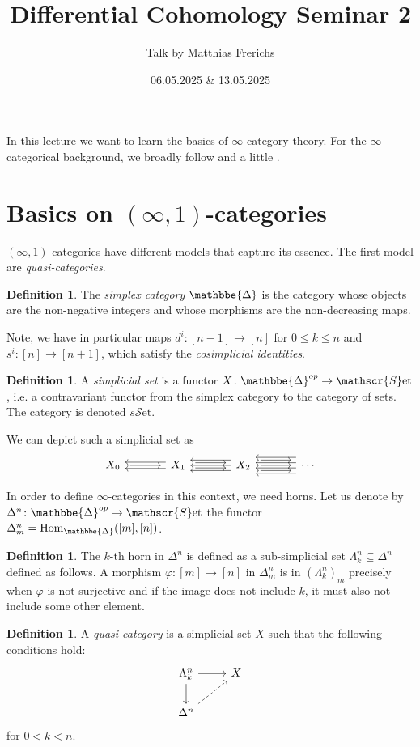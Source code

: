 \documentclass[10pt]{amsart}
\title{Differential Cohomology Seminar 2}
\date{06.05.2025 $\&$ 13.05.2025}
\author{Talk by Matthias Frerichs}
\newcommand{\set}{\mathscr{S}\mathrm{et}}
\newcommand{\sset}{s\mathscr{S}\mathrm{et}}
\newcommand{\Hom}{\mathrm{Hom}}
\def\DDelta{{\mathbbe{\Delta}}}
\newcommand{\DD}{\DDelta}
\newcommand{\simpset}[7]{
 \begin{tikzcd}[row sep=0.5in, column sep=0.5in]
   #1 \arrow[r, shorten >=1ex,shorten <=1ex]
   \pgfmatrixnextcell #2 
   \arrow[l, shift left=1.2, "#5"] \arrow[l, shift right=1.2, "#4"'] 
   \arrow[r, shift right, shorten >=1ex,shorten <=1ex ] \arrow[r, shift left, shorten >=1ex,shorten <=1ex] 
   \pgfmatrixnextcell #3 
   \arrow[l] \arrow[l, shift left=2, "#7"] \arrow[l, shift right=2, "#6 "'] 
   \arrow[r, shorten >=1ex,shorten <=1ex] \arrow[r, shift left=2, shorten >=1ex,shorten <=1ex] \arrow[r, shift right=2, 
   shorten >=1ex,shorten <=1ex]
   \pgfmatrixnextcell \cdots 
   \arrow[l, shift right=1] \arrow[l, shift left=1] \arrow[l, shift right=3] \arrow[l, shift left=3] 
 \end{tikzcd}
}
\theoremstyle{definition}
\newtheorem{definition}[equation]{Definition}
\theoremstyle{remark}
\begin{document}
\maketitle

In this lecture we want to learn the basics of $\infty$-category theory. For the $\infty$-categorical background, we broadly follow \cite{groth2010inftycats} and a little \cite{lurie2009htt}.

\section{Basics on \texorpdfstring{$(\infty,1)$}{(oo,1)}-categories}

$(\infty,1)$-categories have different models that capture its essence. The first model are \emph{quasi-categories}.

\begin{definition}
  The \emph{simplex category} $\DD$ is the category whose objects are the non-negative integers and whose morphisms are the non-decreasing maps. 
\end{definition}

Note, we have in particular maps $d^i \colon [n-1] \to [n]$ for $0 \leq k \leq n$ and $s^i\colon [n] \to [n+1]$, which satisfy the \emph{cosimplicial identities}.


\begin{definition}
  A \emph{simplicial set} is a functor $X \colon \DD^{op} \to \set$, i.e. a contravariant functor from the simplex category to the category of sets. The category is denoted $\sset$.
\end{definition}

We can depict such a simplicial set as 
\[
  \simpset{X_0}{X_1}{X_2}{}{}{}{}
\]

In order to define $\infty$-categories in this context, we need horns. Let us denote by $\Delta^n\colon\DD^{op} \to \set$ the functor $\Delta^n_m = \Hom_\DD([m],[n])$.

\begin{definition}
  The $k$-th horn in $\Delta^n$ is defined as a sub-simplicial set $\Lambda^n_k \subseteq \Delta^n$ defined as follows. A morphism $\varphi\colon[m] \to [n]$ in $\Delta^n_m$ is in $(\Lambda^n_k)_m$ precisely when $\varphi$ is not surjective and if the image does not include $k$, it must also not include some other element.
\end{definition}

\begin{definition}
  A \emph{quasi-category} is a simplicial set $X$ such that the following conditions hold:
  \[
    \begin{tikzcd}
    \Lambda^n_k \arrow[r] \arrow[d] & X \\
    \Delta^n \arrow[ur, dashed] 
    \end{tikzcd}
  \]
  for $0 < k < n$.
\end{definition}
\end{document}
